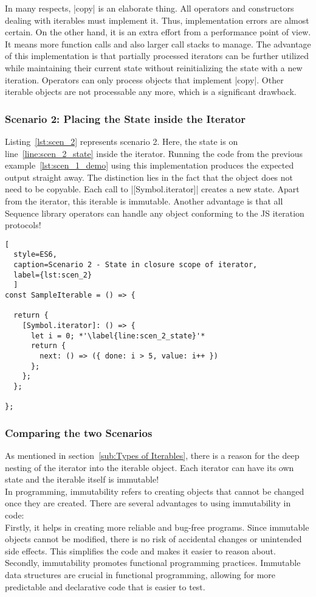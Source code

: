 In many respects, |copy| is an elaborate thing. All operators and constructors 
dealing with iterables must implement it. Thus, implementation errors are 
almost certain. On the other hand, it is an extra effort from a performance point 
of view. It means more function calls and also larger call stacks to manage.
The advantage of this implementation is that partially processed iterators can
be further utilized while maintaining their current state without
reinitializing the state with a new iteration.
Operators can only process objects that implement |copy|.
Other iterable objects are not processable any more, which is a significant
drawback.

\subsubsection{Scenario 2: Placing the State inside the Iterator}
\label{subsub:Scenario 2}
Listing~\ref{lst:scen_2} represents scenario 2. Here, the state is on
line~\ref{line:scen_2_state} inside the iterator. Running the code from the
previous example~\ref{lst:scen_1_demo} using this implementation produces the
expected output straight away. The distinction lies in the fact that the object
does not need to be copyable. Each call to |[Symbol.iterator]| creates a new
state. Apart from the iterator, this iterable is immutable. Another advantage
is that all Sequence library operators can handle any object conforming to the
JS iteration protocols!

\begin{lstlisting}[
  style=ES6, 
  caption=Scenario 2 - State in closure scope of iterator,
  label={lst:scen_2}
  ]
const SampleIterable = () => {

  return {
    [Symbol.iterator]: () => {
      let i = 0; *'\label{line:scen_2_state}'*
      return {
        next: () => ({ done: i > 5, value: i++ })
      };
    };
  };

};
\end{lstlisting}


\subsubsection{Comparing the two Scenarios}
\label{subsub:Comparing the Two Scenarios}
As mentioned in section~\ref{sub:Types of Iterables}, there is a reason for 
the deep nesting of the iterator into the iterable object. 
Each iterator can have its own state and the iterable itself is immutable! \\
In programming, immutability refers to creating objects that cannot be changed
once they are created. There are several advantages to using immutability in
code: \\
Firstly, it helps in creating more reliable and bug-free programs. Since
immutable objects cannot be modified, there is no risk of accidental changes or
unintended side effects. This simplifies the code and makes it easier to reason
about. \\
Secondly, immutability promotes functional programming practices. Immutable
data structures are crucial in functional programming, allowing for more
predictable and declarative code that is easier to test.

